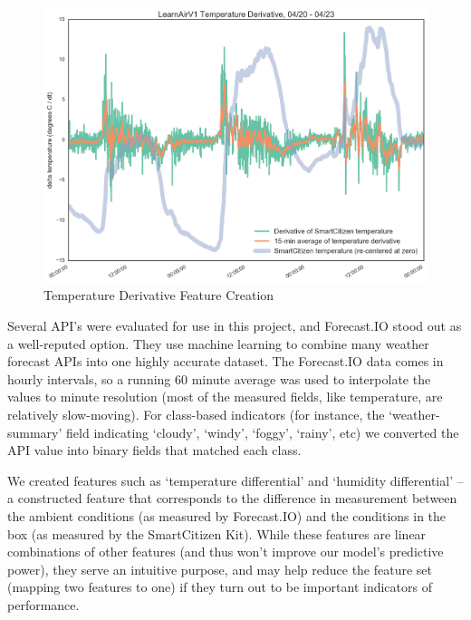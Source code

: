 \begin{figure}[htb]
\centering
 	\includegraphics[width=\textwidth-2cm]{figs/temp_derivative}               
 	 \caption{Temperature Derivative Feature Creation}
  	\label{fig:temp_derivative}
\end{figure}



Several API's were evaluated for use in this project, and Forecast.IO stood out as a well-reputed option.  They use machine learning to combine many weather forecast APIs into one highly accurate dataset.  The Forecast.IO data comes in hourly intervals, so a running 60 minute average was used to interpolate the values to minute resolution (most of the measured fields, like temperature, are relatively slow-moving).  For class-based indicators (for instance, the `weather-summary' field indicating `cloudy', `windy', `foggy', `rainy', etc) we converted the API value into binary fields that matched each class.   

We created features such as `temperature differential' and `humidity differential' -- a constructed feature that corresponds to the difference in measurement between the ambient conditions (as measured by Forecast.IO) and the conditions in the box (as measured by the SmartCitizen Kit).  While these features are linear combinations of other features (and thus won't improve our model's predictive power), they serve an intuitive purpose, and may help reduce the feature set (mapping two features to one) if they turn out to be important indicators of performance.
 
